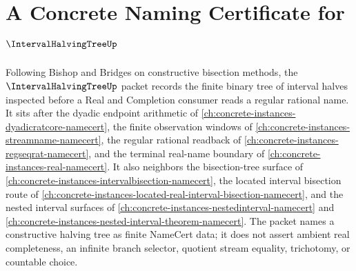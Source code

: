\chapter{A Concrete Naming Certificate for $\IntervalHalvingTreeUp$}
\label{ch:concrete-instances-interval-halving-tree-namecert}

Following Bishop and Bridges on constructive bisection methods, the $\IntervalHalvingTreeUp$ packet records the finite binary tree of interval halves inspected before a Real and Completion consumer reads a regular rational name. It sits after the dyadic endpoint arithmetic of \autoref{ch:concrete-instances-dyadicratcore-namecert}, the finite observation windows of \autoref{ch:concrete-instances-streamname-namecert}, the regular rational readback of \autoref{ch:concrete-instances-regseqrat-namecert}, and the terminal real-name boundary of \autoref{ch:concrete-instances-real-namecert}. It also neighbors the bisection-tree surface of \autoref{ch:concrete-instances-intervalbisection-namecert}, the located interval bisection route of \autoref{ch:concrete-instances-located-real-interval-bisection-namecert}, and the nested interval surfaces of \autoref{ch:concrete-instances-nestedinterval-namecert} and \autoref{ch:concrete-instances-nested-interval-theorem-namecert}. The packet names a constructive halving tree as finite NameCert data; it does not assert ambient real completeness, an infinite branch selector, quotient stream equality, trichotomy, or countable choice.

